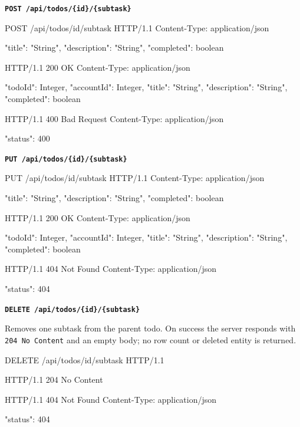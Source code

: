\medskip
\textbf{\texttt{POST /api/todos/\{id\}/\{subtask\}}}

\begin{httpexchange}
\begin{httplisting}
POST /api/todos/{id}/{subtask} HTTP/1.1
Content-Type: application/json

{
    "title": "String",
    "description": "String",
    "completed": boolean
}
\end{httplisting}
\httpmidarrows
\begin{httplisting}
HTTP/1.1 200 OK
Content-Type: application/json

{
    "todoId": Integer,
    "accountId": Integer,
    "title": "String",
    "description": "String",
    "completed": boolean
}

HTTP/1.1 400 Bad Request
Content-Type: application/json

{
    "status": 400
}
\end{httplisting}
\end{httpexchange}

\medskip
\textbf{\texttt{PUT /api/todos/\{id\}/\{subtask\}}}

\begin{httpexchange}
\begin{httplisting}
PUT /api/todos/{id}/{subtask} HTTP/1.1
Content-Type: application/json

{
    "title": "String",
    "description": "String",
    "completed": boolean
}
\end{httplisting}
\httpmidarrows
\begin{httplisting}
HTTP/1.1 200 OK
Content-Type: application/json

{
    "todoId": Integer,
    "accountId": Integer,
    "title": "String",
    "description": "String",
    "completed": boolean
}

HTTP/1.1 404 Not Found
Content-Type: application/json

{
    "status": 404
}
\end{httplisting}
\end{httpexchange}

\newpage



\textbf{\texttt{DELETE /api/todos/\{id\}/\{subtask\}}}

Removes one subtask from the parent todo. On success the server responds with
\texttt{204 No Content} and an empty body; no row count or deleted entity is returned.

\begin{httpexchange}
\begin{httplisting}
DELETE /api/todos/{id}/{subtask} HTTP/1.1
\end{httplisting}
\httpmidarrows
\begin{httplisting}
HTTP/1.1 204 No Content

HTTP/1.1 404 Not Found
Content-Type: application/json

{
    "status": 404
}
\end{httplisting}
\end{httpexchange}

